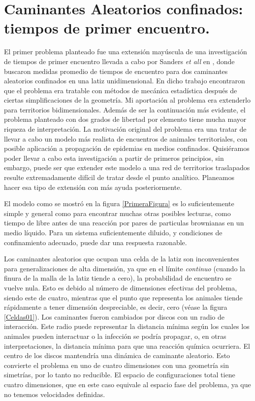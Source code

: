 \documentclass[letterpaper, 11pt]{article}
\begin{document}
\section{Caminantes Aleatorios confinados: tiempos de primer encuentro.}

El primer problema planteado fue una extensión mayúscula
 de una investigación
de tiempos de primer encuentro llevada a cabo por 
Sanders \emph{et all} en \cite{SandersLuca}, donde buscaron medidas
promedio de tiempos de encuentro para dos
caminantes aleatorios confinados en una latiz unidimensional.
En dicho trabajo encontraron que el problema
era tratable con métodos de mecánica estadística después de ciertas
simplificaciones de la geometría. 
Mi aportación al problema
era extenderlo para territorios bidimensionales. 
Además de ser la continuación más evidente, el problema
planteado con dos grados de libertad por elemento tiene
mucha mayor riqueza de interpretación.
La motivación original del problema era una tratar de llevar a cabo
un modelo más realista de encuentros de animales territoriales, con posible
aplicación a propagación de epidemias en medios confinados. 
Quisiéramos poder llevar a cabo esta investigación a partir
de primeros principios, sin embargo, puede ser que extender
este modelo a una red de territorios traslapados 
resulte extremadamente difícil de tratar desde el punto
analítico. Planeamos hacer esa tipo de extensión con
más ayuda posteriormente.

El modelo como se mostró en la figura \ref{PrimeraFigura}
es lo suficientemente simple y general como para encontrar muchas 
otras posibles lecturas, como tiempo de libre antes
de una reacción por pares de 
particulas brownianas en un medio líquido. Para un sistema
suficientemente diluido, y condiciones de confinamiento
adecuado, puede dar una respuesta razonable.


Los caminantes aleatorios que ocupan una celda de la latiz son inconvenientes
para generalizaciones de alta dimensión, ya que en el límite 
\emph{continuo} (cuando la finura de la malla de la latiz tiende a cero),
la probabilidad de encuentro se vuelve nula. Esto es debido al número de
dimensiones efectivas del problema, siendo este de cuatro, mientras
que el punto que representa los animales tiende rápidamente
a tener dimensión despreciable, es decir, 
cero (véase la figura \ref{Celdas01}). 
Los caminantes fueron cambiados por discos con un
radio de interacción. Este radio puede representar la distancia mínima
según los cuales los animales pueden interactuar o la infección se 
podría propagar, o, en otras interpretaciones, la distancia mínima para
que una reacción química ocurriera. El centro de los discos
mantendría una dinámica de caminante aleatorio. Esto convierte el problema
en uno de cuatro dimensiones con una geometría sin simetrías, por lo tanto
no reducible. El espacio de configuraciones
 total tiene cuatro dimensiones, que en este caso equivale al espacio
fase del problema, ya que no tenemos velocidades definidas.
\end{document}
